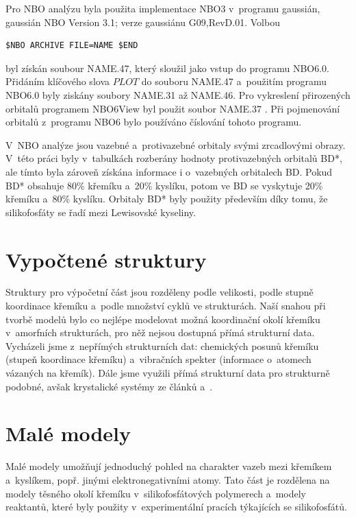 \documentclass[
digital, %
table,   %
lof,     %
lot,     %
oneside,
]{fithesis3}
\begin{document}
Pro NBO analýzu byla použita implementace NBO3 v~programu gaussián, gaussián NBO Version 3.1; verze gaussiánu G09,RevD.01. Volbou \begin{lstlisting}[frame=single]
$NBO ARCHIVE FILE=NAME $END
\end{lstlisting}
byl získán soubour NAME.47, který sloužil jako vstup do programu NBO6.0. Přidáním klíčového slova $PLOT$ do souboru NAME.47 a~použitím programu NBO6.0 byly ziskány soubory NAME.31 až NAME.46. Pro vykreslení přirozených orbitalů programem NBO6View byl použit soubor NAME.37 \cite{doi:10.1002/jcc.23266}. Při pojmenování orbitalů z~programu NBO6 bylo používáno číslování tohoto programu.

V~NBO analýze jsou vazebné a~protivazebné orbitaly svými zrcadlovými obrazy. V~této práci byly v~tabulkách rozberány hodnoty protivazebných orbitalů BD*, ale tímto byla zároveň získána informace i o~vazebných orbitalech BD. Pokud BD* obsahuje 80\% křemíku a~20\% kyslíku, potom ve BD se vyskytuje 20\% křemíku a~80\% kyslíku. Orbitaly BD* byly použity především díky tomu, že silikofosfáty se řadí mezi Lewisovské kyseliny.

\section{Vypočtené struktury}\label{vypoctene_struktury}
Struktury pro výpočetní část jsou rozděleny podle velikosti, podle stupně koordinace křemíku a~podle množství cyklů ve strukturách. Naší snahou při tvorbě modelů bylo co nejlépe modelovat možná koordinační okolí křemíku v~amorfních strukturách, pro něž nejsou dostupná přímá strukturní data. Vycházeli jsme z~nepřímých strukturních dat: chemických posunů křemíku (stupeň koordinace křemíku) a~vibračních spekter (informace o~atomech vázaných na křemík). Dále jsme využili přímá strukturní data pro strukturně podobné, avšak krystalické systémy ze článků \cite{C3NJ00721A} a~\cite{rtg_4_pinkas}.

\section{Malé modely}
Malé modely umožňují jednoduchý pohled na charakter vazeb mezi křemíkem a~kyslíkem, popř. jinými elektronegativními atomy. Tato část je rozdělena na modely těsného okolí křemíku v~silikofosfátových polymerech a~modely reaktantů, které byly použity v~experimentální pracích týkajících se silikofosfátů.
\end{document}
